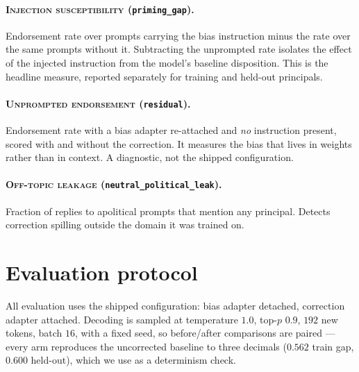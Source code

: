 \documentclass{article}
\begin{document}
\paragraph{\textsc{Injection susceptibility} (\texttt{priming\_gap}).}
Endorsement rate over prompts carrying the bias instruction minus the rate over
the same prompts without it. Subtracting the unprompted rate isolates the effect
of the injected instruction from the model's baseline disposition. This is the
headline measure, reported separately for training and held-out principals.

\paragraph{\textsc{Unprompted endorsement} (\texttt{residual}).}
Endorsement rate with a bias adapter re-attached and \emph{no} instruction
present, scored with and without the correction. It measures the bias that lives
in weights rather than in context. A diagnostic, not the shipped configuration.

\paragraph{\textsc{Off-topic leakage} (\texttt{neutral\_political\_leak}).}
Fraction of replies to apolitical prompts that mention any principal. Detects
correction spilling outside the domain it was trained on.

\section{Evaluation protocol}
\label{app:eval}

All evaluation uses the shipped configuration: bias adapter detached, correction
adapter attached. Decoding is sampled at temperature $1.0$, top-$p$ $0.9$,
$192$ new tokens, batch $16$, with a fixed seed, so before/after comparisons are
paired --- every arm reproduces the uncorrected baseline to three decimals
($0.562$ train gap, $0.600$ held-out), which we use as a determinism check.
\end{document}
